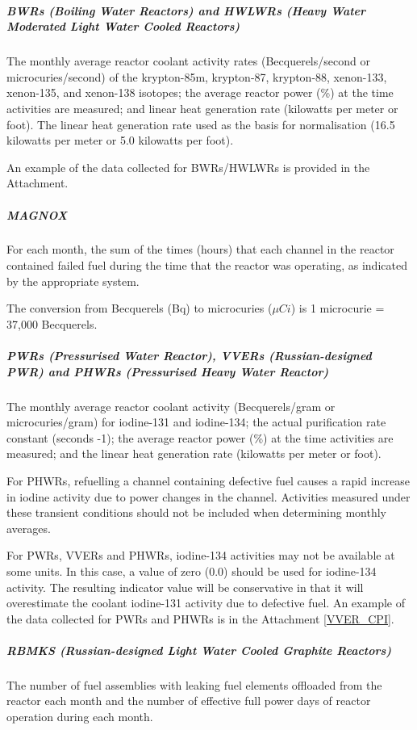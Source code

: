 \subparagraph{BWRs (Boiling Water Reactors) and HWLWRs (Heavy Water Moderated Light
Water Cooled Reactors)}

The monthly average reactor coolant activity rates (Becquerels/second or microcuries/second) of the krypton-85m, krypton-87, krypton-88, xenon-133, xenon-135, and xenon-138 isotopes; the average reactor power (\%) at the time activities are measured; and linear heat generation rate (kilowatts per meter or foot).
The linear heat generation rate used as the basis for normalisation
(16.5 kilowatts per meter or 5.0 kilowatts per foot).

An example of the data collected for BWRs/HWLWRs is provided in the Attachment.

\subparagraph{MAGNOX}

For each month, the sum of the times (hours) that each channel in the
reactor contained failed fuel during the time that the reactor was
operating, as indicated by the appropriate system.

The conversion from Becquerels (Bq) to microcuries ($\mu Ci$) is 1
microcurie = 37,000 Becquerels.

\subparagraph{PWRs (Pressurised Water Reactor), VVERs
  (Russian-designed PWR) and PHWRs (Pressurised Heavy Water Reactor)}

The monthly average reactor coolant activity (Becquerels/gram or
microcuries/gram) for iodine-131 and iodine-134; the actual
purification rate constant (seconds -1); the average reactor power
(\%) at the time activities are measured; and the linear heat
generation rate (kilowatts per meter or foot).

For PHWRs, refuelling a channel containing defective fuel causes a
rapid increase in iodine activity due to power changes in the
channel. Activities measured under these transient conditions should
not be included when determining monthly averages.

For PWRs, VVERs and PHWRs, iodine-134 activities may not be available at some units. In this case, a value of zero (0.0) should be used for iodine-134 activity. The resulting indicator value will be conservative in that it will overestimate the coolant iodine-131 activity due to defective fuel.
An example of the data collected for PWRs and PHWRs is in the
Attachment \ref{VVER_CPI}.

\subparagraph{RBMKS (Russian-designed Light Water Cooled Graphite
  Reactors)}

The number of fuel assemblies with leaking fuel elements offloaded
from the reactor each month and the number of effective full power
days of reactor operation during each month.

